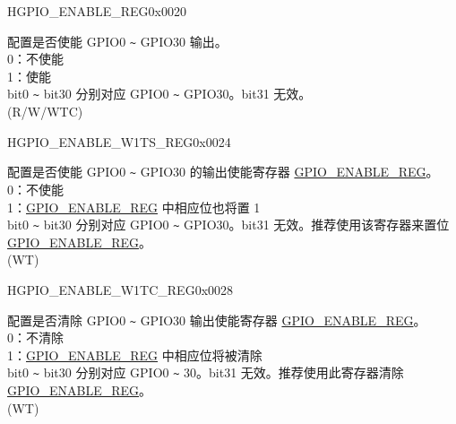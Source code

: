 \begin{register}{H}{GPIO\_ENABLE\_REG}{0x0020}\label{regdesc:GPIOENABLEREG}
%
\regnewline%
\begin{regdesc}\begin{reglist}
\label{fielddesc:GPIOENABLEDATA}\item [GPIO\_ENABLE\_DATA] 配置是否使能 GPIO0 \verb+~+ GPIO30 输出。\\
0：不使能\\
1：使能\\
bit0 \verb+~+ bit30 分别对应 GPIO0 \verb+~+ GPIO30。bit31 无效。\\
(R/W/WTC)
\end{reglist}\end{regdesc}
\end{register}


\begin{register}{H}{GPIO\_ENABLE\_W1TS\_REG}{0x0024}\label{regdesc:GPIOENABLEW1TSREG}
%
\regnewline%
\begin{regdesc}\begin{reglist}
\label{fielddesc:GPIOENABLEW1TS}\item [GPIO\_ENABLE\_W1TS] 配置是否使能 GPIO0 \verb+~+ GPIO30 的输出使能寄存器 \hyperref[regdesc:GPIOENABLEREG]{GPIO\_ENABLE\_REG}。\\
0：不使能\\
1：\hyperref[regdesc:GPIOENABLEREG]{GPIO\_ENABLE\_REG} 中相应位也将置 1\\
bit0 \verb+~+ bit30 分别对应 GPIO0 \verb+~+ GPIO30。bit31 无效。推荐使用该寄存器来置位 \hyperref[regdesc:GPIOENABLEREG]{GPIO\_ENABLE\_REG}。\\
(WT)
\end{reglist}\end{regdesc}
\end{register}


\begin{register}{H}{GPIO\_ENABLE\_W1TC\_REG}{0x0028}\label{regdesc:GPIOENABLEW1TCREG}
%
\regnewline%
\begin{regdesc}\begin{reglist}
\label{fielddesc:GPIOENABLEW1TC}\item [GPIO\_ENABLE\_W1TC] 配置是否清除 GPIO0 \verb+~+ GPIO30 输出使能寄存器 \hyperref[regdesc:GPIOENABLEREG]{GPIO\_ENABLE\_REG}。 \\
0：不清除\\
1：\hyperref[regdesc:GPIOENABLEREG]{GPIO\_ENABLE\_REG} 中相应位将被清除\\
bit0 \verb+~+ bit30 分别对应 GPIO0 \verb+~+ 30。bit31 无效。推荐使用此寄存器清除 \hyperref[regdesc:GPIOENABLEREG]{GPIO\_ENABLE\_REG}。\\
(WT)
\end{reglist}\end{regdesc}
\end{register}

